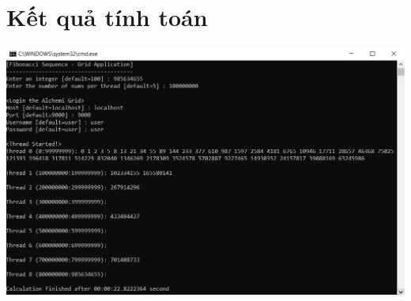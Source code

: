 \documentclass[12pt,a4paper]{report}
\begin{document}
\section{Kết quả tính toán}
\begin{center}
\includegraphics[scale=.6]{./Figures/FibonacciSequence/Res_FibonacciSequence}
\clearpage
\end{center}

\clearpage
\end{document}
